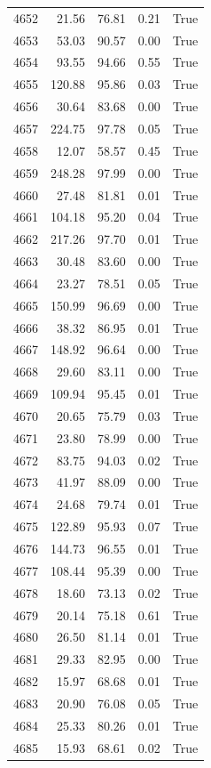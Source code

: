 \begin{longtable}{rrrrr}
4652 & 21.56 & 76.81 & 0.21 & True \\
4653 & 53.03 & 90.57 & 0.00 & True \\
4654 & 93.55 & 94.66 & 0.55 & True \\
4655 & 120.88 & 95.86 & 0.03 & True \\
4656 & 30.64 & 83.68 & 0.00 & True \\
4657 & 224.75 & 97.78 & 0.05 & True \\
4658 & 12.07 & 58.57 & 0.45 & True \\
4659 & 248.28 & 97.99 & 0.00 & True \\
4660 & 27.48 & 81.81 & 0.01 & True \\
4661 & 104.18 & 95.20 & 0.04 & True \\
4662 & 217.26 & 97.70 & 0.01 & True \\
4663 & 30.48 & 83.60 & 0.00 & True \\
4664 & 23.27 & 78.51 & 0.05 & True \\
4665 & 150.99 & 96.69 & 0.00 & True \\
4666 & 38.32 & 86.95 & 0.01 & True \\
4667 & 148.92 & 96.64 & 0.00 & True \\
4668 & 29.60 & 83.11 & 0.00 & True \\
4669 & 109.94 & 95.45 & 0.01 & True \\
4670 & 20.65 & 75.79 & 0.03 & True \\
4671 & 23.80 & 78.99 & 0.00 & True \\
4672 & 83.75 & 94.03 & 0.02 & True \\
4673 & 41.97 & 88.09 & 0.00 & True \\
4674 & 24.68 & 79.74 & 0.01 & True \\
4675 & 122.89 & 95.93 & 0.07 & True \\
4676 & 144.73 & 96.55 & 0.01 & True \\
4677 & 108.44 & 95.39 & 0.00 & True \\
4678 & 18.60 & 73.13 & 0.02 & True \\
4679 & 20.14 & 75.18 & 0.61 & True \\
4680 & 26.50 & 81.14 & 0.01 & True \\
4681 & 29.33 & 82.95 & 0.00 & True \\
4682 & 15.97 & 68.68 & 0.01 & True \\
4683 & 20.90 & 76.08 & 0.05 & True \\
4684 & 25.33 & 80.26 & 0.01 & True \\
4685 & 15.93 & 68.61 & 0.02 & True \\

\end{longtable}
